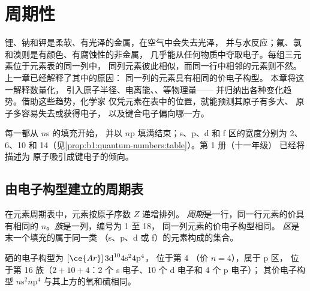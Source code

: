 \chapter{周期性}\label{ch:b1:periodicity}

锂、钠和钾是柔软、有光泽的金属，在空气中会失去光泽，
并与水反应；氟、氯和溴则是有颜色、有腐蚀性的非金属，
几乎能从任何物质中夺取电子。每组三元素位于元素表的同一列中，
同列元素彼此相似，而同一行中相邻的元素则不然。
上一章已经解释了其中的原因：
同一列的元素具有相同的价电子构型。
本章将这一解释数量化，
引入原子半径、电离能、、等物理量——
并归纳出各种变化趋势。借助这些趋势，化学家
仅凭元素在表中的位置，就能预测其原子有多大、
原子多容易失去或获得电子，
以及键合电子偏向哪一方。

\begin{recall}
每一都从 $n$s 的填充开始，
并以 $n$p 填满结束；s、p、d 和 f 区的宽度分别为 2、6、10
和 14（见\cref{prop:b1:quantum-numbers:table}）。第 1 册（十一年级）
已经将描述为
原子吸引成键电子的倾向。
\end{recall}

\section{由电子构型建立的周期表}

\begin{definition}[周期、族、区]\label{def:b1:periodicity:table}
在元素周期表中，元素按原子序数 $Z$ 递增排列。
\emph{周期}是一行，同一行元素的价具有相同的
 $n$。\emph{族}是一列，编号为 1 至 18，
同一列元素的价电子构型相同。
\emph{区}是末一个填充的属于同一类
（s、p、d 或 f）的元素构成的集合。
\end{definition}

\begin{example}[判断元素的位置]\label{ex:b1:periodicity:position}
硒的电子构型为 $[\ce{Ar}]\,3\text{d}^{10} 4\text{s}^2 4\text{p}^4$，
位于第 4 （价 $n = 4$），属于 p 区，
位于第 16 族（$2 + 10 + 4$：2 个 s 电子、10 个 d 电子和 4 个 p 电子）；
其价电子构型 $n\text{s}^2 n\text{p}^4$ 与其上方的氧和硫相同。
\end{example}

